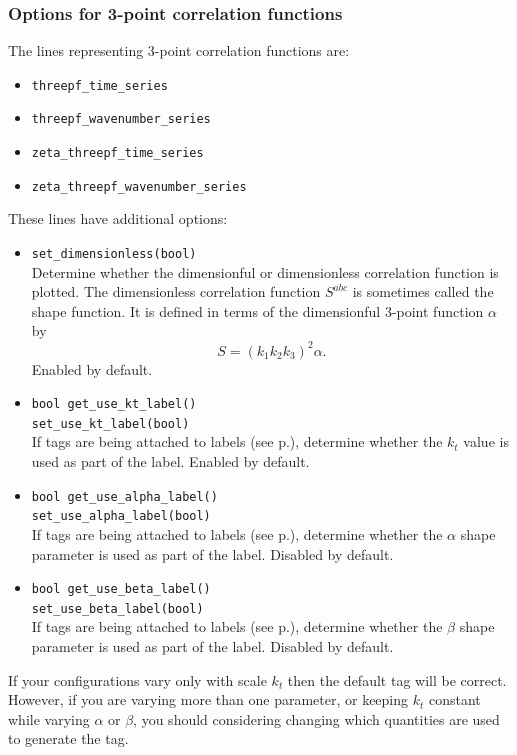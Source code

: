\documentclass[11pt,a4paper]{article}
\newcommand{\DimlessB}{S}
\begin{document}
\subsubsection{Options for 3-point correlation functions}
The lines representing 3-point correlation functions are:
\begin{itemize}
    \item \texttt{threepf_time_series}
    \item \texttt{threepf_wavenumber_series}
    \item \texttt{zeta_threepf_time_series}
    \item \texttt{zeta_threepf_wavenumber_series}
\end{itemize}
These lines have additional options:
\begin{itemize}
    \item \texttt{set_dimensionless(bool)} \\
    Determine whether the dimensionful or dimensionless correlation
    function is plotted.
    The dimensionless correlation function $\DimlessB^{abc}$
    is sometimes called the shape function.
    It is defined
    in terms of the dimensionful 3-point function $\alpha$
    by
    \begin{equation}
        \DimlessB = (k_1 k_2 k_3)^2 \alpha .
    \end{equation}
    Enabled by default.
    
    \item \texttt{bool get_use_kt_label()} \\
    \texttt{set_use_kt_label(bool)} \\
    If tags are
    being attached to labels
    (see p.\pageref{method:get_label_tags}),
    determine whether the $k_t$ value is used as part of the label.
    Enabled by default.
    
    \item \texttt{bool get_use_alpha_label()} \\
    \texttt{set_use_alpha_label(bool)} \\
    If tags are
    being attached to labels
    (see p.\pageref{method:get_label_tags}),
    determine whether the $\alpha$ shape parameter is used as part of the label.
    Disabled by default.
    
    \item \texttt{bool get_use_beta_label()} \\
    \texttt{set_use_beta_label(bool)} \\
    If tags are
    being attached to labels
    (see p.\pageref{method:get_label_tags}),
    determine whether the $\beta$ shape parameter is used as part of the label.
    Disabled by default.
\end{itemize}
If your configurations vary only with scale $k_t$ then the default tag
will be correct.
However, if you are varying more than one parameter, or keeping $k_t$
constant while varying $\alpha$ or $\beta$,
you should considering changing which quantities are
used to generate the tag.
\end{document}
